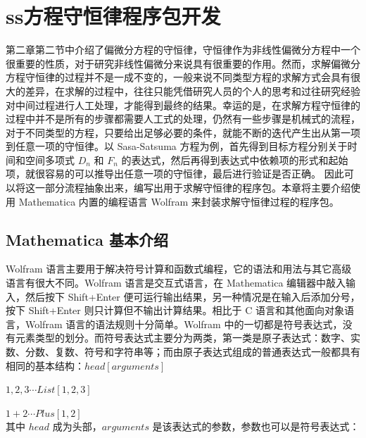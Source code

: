 
\chapter{ss方程守恒律程序包开发}
第二章第二节中介绍了偏微分方程的守恒律，守恒律作为非线性偏微分方程中一个很重要的性质，对于研究非线性偏微分来说具有很重要的作用。然而，求解偏微分方程守恒律的过程并不是一成不变的，一般来说不同类型方程的求解方式会具有很大的差异，在求解的过程中，往往只能凭借研究人员的个人的思考和过往研究经验对中间过程进行人工处理，才能得到最终的结果。幸运的是，在求解方程守恒律的过程中并不是所有的步骤都需要人工式的处理，仍然有一些步骤是机械式的流程，对于不同类型的方程，只要给出足够必要的条件，就能不断的迭代产生出从第一项到任意一项的守恒律。以 Sasa-Satsuma 方程为例，首先得到目标方程分别关于时间和空间多项式 $D_n$ 和 $F_n$ 的表达式，然后再得到表达式中依赖项的形式和起始项，就很容易的可以推导出任意一项的守恒律，最后进行验证是否正确。 因此可以将这一部分流程抽象出来，编写出用于求解守恒律的程序包。本章将主要介绍使用 Mathematica 内置的编程语言 Wolfram 来封装求解守恒律过程的程序包。

\section{Mathematica 基本介绍}
Wolfram 语言主要用于解决符号计算和函数式编程，它的语法和用法与其它高级语言有很大不同。Wolfram 语言是交互式语言，在 Mathematica 编辑器中敲入输入，然后按下 Shift+Enter 便可运行输出结果，另一种情况是在输入后添加分号，按下 Shift+Enter 则只计算但不输出计算结果。相比于 C 语言和其他面向对象语言，Wolfram 语言的语法规则十分简单。Wolfram 中的一切都是符号表达式，没有元素类型的划分。而符号表达式主要分为两类，第一类是原子表达式：数字、实数、分数、复数、符号和字符串等；而由原子表达式组成的普通表达式一般都具有相同的基本结构：$head[arguments]$

${1,2,3} \cdots List[1,2,3]$

$1+2 \cdots Plus[1,2]$\\
其中 $head$ 成为头部，$arguments$ 是该表达式的参数，参数也可以是符号表达式：

